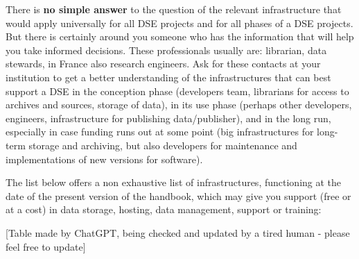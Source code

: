 \documentclass[
  letterpaper,
  DIV=11,
  numbers=noendperiod]{scrreprt}
\begin{document}
There is \textbf{no simple answer} to the question of the relevant
infrastructure that would apply universally for all DSE projects and for
all phases of a DSE projects. But there is certainly around you someone
who has the information that will help you take informed decisions.
These professionals usually are: librarian, data stewards, in France
also research engineers. Ask for these contacts at your institution to
get a better understanding of the infrastructures that can best support
a DSE in the conception phase (developers team, librarians for access to
archives and sources, storage of data), in its use phase (perhaps other
developers, engineers, infrastructure for publishing data/publisher),
and in the long run, especially in case funding runs out at some point
(big infrastructures for long-term storage and archiving, but also
developers for maintenance and implementations of new versions for
software).

The list below offers a non exhaustive list of infrastructures,
functioning at the date of the present version of the handbook, which
may give you support (free or at a cost) in data storage, hosting, data
management, support or training:

{[}Table made by ChatGPT, being checked and updated by a tired human -
please feel free to update{]}
\end{document}

